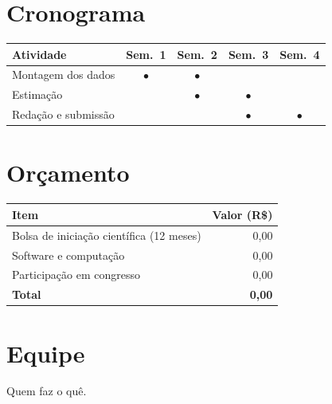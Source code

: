 \documentclass[12pt,a4paper]{article}
\begin{document}
\section{Cronograma}
\begin{table}[h]
  \centering
  \begin{tabular}{lcccc}
    \toprule
    Atividade & Sem.~1 & Sem.~2 & Sem.~3 & Sem.~4 \\
    \midrule
    Montagem dos dados & $\bullet$ & $\bullet$ & & \\
    Estimação & & $\bullet$ & $\bullet$ & \\
    Redação e submissão & & & $\bullet$ & $\bullet$ \\
    \bottomrule
  \end{tabular}
\end{table}

\section{Orçamento}
\begin{table}[h]
  \centering
  \begin{tabularx}{0.8\textwidth}{Xr}
    \toprule
    Item & Valor (R\$) \\
    \midrule
    Bolsa de iniciação científica (12 meses) & 0,00 \\
    Software e computação & 0,00 \\
    Participação em congresso & 0,00 \\
    \midrule
    \textbf{Total} & \textbf{0,00} \\
    \bottomrule
  \end{tabularx}
\end{table}

\section{Equipe}
Quem faz o quê.



\end{document}
